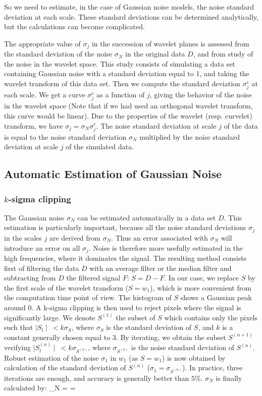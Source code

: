 So we need to estimate, in the case of Gaussian noise models, the noise standard deviation at each scale. 
These standard deviations can be determined analytically, but the calculations can become complicated.  

The appropriate value of $\sigma_j$ in the succession of wavelet planes is assessed from the standard deviation 
of the noise $\sigma_N$ in the original data $D$, and from study of the noise in the wavelet space. This study 
consists of simulating a data set containing Gaussian noise with a standard deviation equal to 1, and taking the 
wavelet transform of this data set. Then we compute the standard deviation $\sigma^e_j$ at each scale. We get a curve 
$\sigma^e_j$ as a function of $j$, giving the behavior of the noise in the wavelet space (Note that if we had used 
an orthogonal wavelet transform, this curve would be linear). Due to the properties of the wavelet (resp. curvelet) 
transform, we have $ \sigma_j = \sigma_N \sigma^e_j $. The noise standard deviation at scale $j$ of the data is equal 
to the noise standard deviation $\sigma_N$ multiplied by the noise standard deviation at scale $j$ of the simulated data.

\subsection{Automatic Estimation of Gaussian Noise}
\subsubsection{$k$-sigma clipping}
The Gaussian noise $\sigma_N$ can be estimated automatically in a data set $D$. This estimation is particularly important, 
because all the noise standard deviations $\sigma_j$ in the scales $j$ are derived from $\sigma_N$. Thus an error associated 
with $\sigma_N$ will introduce an error on all $\sigma_j$. Noise is therefore more usefully estimated in the high frequencies, 
where it dominates the signal. The resulting method consists first of filtering the data $D$ with an average filter or the 
median filter and subtracting from $D$ the filtered signal $F$: $S = D - F $. In our case, we replace $S$ by the first scale 
of the wavelet transform ($S = w_1$), which is more convenient from the computation time point of view. The histogram of $S$ 
shows a Gaussian peak around 0. A k-sigma clipping is then used to reject pixels where the signal is significantly large. 
We denote $S^{(1)}$ the subset of $S$ which contains only the pixels such that $\mid S_l \mid \ < k \sigma_S$, where $\sigma_S$ 
is the standard deviation of $S$, and $k$ is a constant generally chosen equal to 3. By iterating, we obtain the subset $S^{(n+1)}$ 
verifying $\mid S^{(n)}_l \mid \ < k \sigma_{S^{(n)}}$, where $\sigma_{S^{(n)}}$ is the noise standard deviation of $S^{(n)}$. 
Robust estimation of the noise $\sigma_1$ in $w_1$ (as $S = w_1$) is now obtained by calculation of the standard deviation of 
$S^{(n)}$ ($\sigma_1 = \sigma_{S^{(n)}}$). In practice, three iterations are enough, and accuracy is generally better than $5$\%.
$\sigma_N$ is finally calculated by: 
\be
\sigma_N =  = 
\ee


